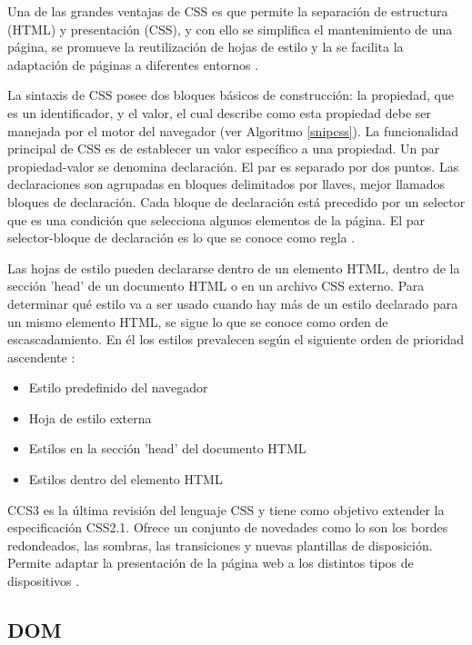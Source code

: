 Una de las grandes ventajas de CSS es que permite la separación de estructura (HTML) y presentación (CSS), y con ello se simplifica el mantenimiento de una página, se promueve la reutilización de hojas de estilo y la se facilita la adaptación de páginas a diferentes entornos \cite{HnC13}.

La sintaxis de CSS posee dos bloques básicos de construcción: la propiedad, que es un identificador, y el valor, el cual describe como esta propiedad debe ser manejada por el motor del navegador (ver Algoritmo \ref{snipcss}). La funcionalidad principal de CSS es de establecer un valor específico a una propiedad. Un par propiedad-valor se denomina declaración. El par es separado por dos puntos. Las declaraciones son agrupadas en bloques delimitados por llaves, mejor llamados bloques de declaración. Cada bloque de declaración está precedido por un selector que es una condición que selecciona algunos elementos de la página. El par selector-bloque de declaración es lo que se conoce como regla \cite{MozCSS}.



Las hojas de estilo pueden declararse dentro de un elemento HTML, dentro de la sección 'head' de un documento HTML o en un archivo CSS externo. Para determinar qué estilo va a ser usado cuando hay más de un estilo declarado para un mismo elemento HTML, se sigue lo que se conoce como orden de escascadamiento. En él los estilos prevalecen según el siguiente orden de prioridad ascendente \cite{CssHT}:

\begin{itemize}
  \item Estilo predefinido del navegador
  \item Hoja de estilo externa
  \item Estilos en la sección 'head' del documento HTML
  \item Estilos dentro del elemento HTML
\end{itemize}

CCS3 es la última revisión del lenguaje CSS y tiene como objetivo extender la especificación CSS2.1. Ofrece un conjunto de novedades como lo son los bordes redondeados, las sombras, las transiciones y nuevas plantillas de disposición. Permite adaptar la presentación de la página web a los distintos tipos de dispositivos \cite{MozCSS3}.

\subsection{DOM}

